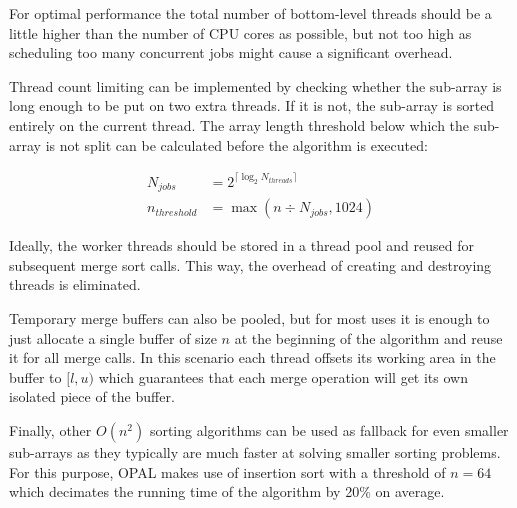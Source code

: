 For optimal performance the total number of bottom-level threads should be a little higher than the number of CPU cores as possible, but not too high as scheduling too many concurrent jobs might cause a significant overhead.

Thread count limiting can be implemented by checking whether the sub-array is long enough to be put on two extra threads. If it is not, the sub-array is sorted entirely on the current thread. The array length threshold below which the sub-array is not split can be calculated before the algorithm is executed:

\begin{equation*}
    \begin{aligned}
        N_{jobs} &= 2^{\lceil \log_2 N_{threads} \rceil} \\
        n_{threshold} &= \max(n \div N_{jobs}, 1024)
    \end{aligned}
\end{equation*}

Ideally, the worker threads should be stored in a thread pool and reused for subsequent merge sort calls. This way, the overhead of creating and destroying threads is eliminated.

Temporary merge buffers can also be pooled, but for most uses it is enough to just allocate a single buffer of size $n$ at the beginning of the algorithm and reuse it for all merge calls. In this scenario each thread offsets its working area in the buffer to $[l, u)$ which guarantees that each merge operation will get its own isolated piece of the buffer.

Finally, other $O(n^2)$ sorting algorithms can be used as fallback for even smaller sub-arrays as they typically are much faster at solving smaller sorting problems. For this purpose, OPAL makes use of insertion sort with a threshold of $n = 64$ which decimates the running time of the algorithm by 20\% on average.
